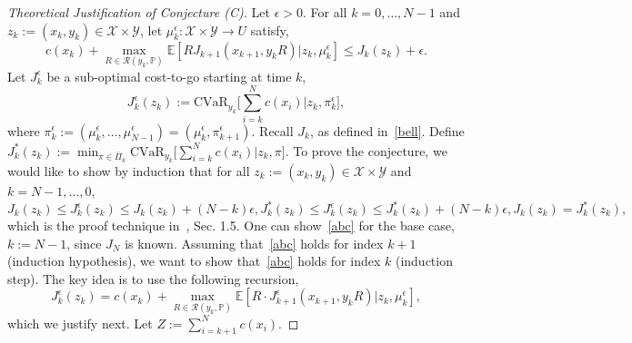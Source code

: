 \documentclass[letterpaper, 10 pt, conference]{ieeeconf}  %
\newcommand{\mpc}[1]{{\color{cyan} #1}}
\newcommand{\mpc}[1]{#1}
\begin{document}
\begin{proof}[Theoretical Justification of Conjecture (C)]
Let $\epsilon > 0$. For all $k = 0, \dots, N-1$ and $z_k := (x_k, y_k) \in \mathcal{X} \times \mathcal{Y}$, let $\mu_k^\epsilon : \mathcal{X} \times \mathcal{Y} \to U$ satisfy,
%
\begin{equation} 
c(x_k) + {\underset{R \in \mathcal{R}(y_k, \mathbb{P})}\max} \mathbb{E}[ RJ_{k+1}(x_{k+1}, y_k R) | z_k, \mu_k^\epsilon] \leq J_k(z_k) + \epsilon.
\label{first}\end{equation} 
%
Let $J_k^\epsilon$ be a sub-optimal cost-to-go starting at time $k$,
%
\begin{equation} 
J_k^\epsilon(z_k) := \text{CVaR}_{y_k}\big[\textstyle \sum_{i=k}^N c(x_i) \big| z_k, \pi_k^\epsilon \big],
\label{Jkeps}\end{equation}
%
where $\pi_k^\epsilon := (\mu_k^\epsilon,\dots,\mu_{N-1}^\epsilon) = (\mu_k^\epsilon, \pi_{k+1}^\epsilon)$. Recall $J_k$, as defined in~\eqref{bell}. Define $J_k^*(z_k) := \min_{\pi \in \bar{\Pi}_k} \text{CVaR}_{y_k}\big[\textstyle \sum_{i=k}^N c(x_i) \big| z_k, \pi \big]$.
\mpc{To prove the conjecture, we would like to show  by induction} that for all $z_k := (x_k, y_k) \in \mathcal{X} \times \mathcal{Y}$ and $k = N-1, \dots, 0$,
%
\begin{subequations}\label{abc}
\begin{equation}
J_k(z_k) \leq J_k^\epsilon(z_k) \leq J_k(z_k) + (N-k)\epsilon, 
\label{a}\end{equation}
%
\begin{equation}
J_k^*(z_k) \leq J_k^\epsilon(z_k) \leq J_k^*(z_k) + (N-k)\epsilon, 
\label{b}\end{equation}
%
\begin{equation}
J_k(z_k) = J_k^*(z_k), 
\label{c}\end{equation}
\end{subequations}
%
which is the proof technique in~\cite{bertsekas2005dynamic}, Sec. 1.5. 
One can show~\eqref{abc} for the base case, $k := N-1$, since $J_N$ is known.
Assuming that~\eqref{abc} holds for index $k+1$ (induction hypothesis), we \mpc{want to} show that~\eqref{abc} holds for index $k$ (induction step). The key 
idea is to use the following recursion,
%
\begin{equation}
J_k^\epsilon(z_k) = c(x_k) + {\underset{R \in \mathcal{R}(y_k, \mathbb{P})}\max} \mathbb{E}[ R\cdot J^\epsilon_{k+1}(x_{k+1}, y_k R) | z_k, \mu_k^\epsilon],
\label{Jkepsrec}\end{equation}
%
which we \mpc{justify} next. Let $Z := \sum_{i=k+1}^N c(x_i)$. 

\end{proof}
\end{document}
